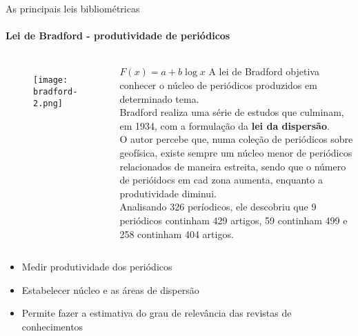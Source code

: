 \begin{frame}[t]{As principais leis bibliométricas}
    \framesubtitle{Lei de Bradford - produtividade de periódicos}
       
          

    \begin{columns}

        \begin{figure}
            \texttt{[image: bradford-2.png]}
        \end{figure}

        \centering
        $F(x) = a + b \log x$
        A lei de Bradford objetiva conhecer o núcleo de periódicos produzidos em determinado tema.\\
        \scriptsize{
            Bradford realiza uma série de estudos que culminam, em 1934, com a formulação da \textbf{lei da dispersão}.\\
            O autor percebe que, numa coleção de periódicos sobre geofísica, existe sempre um núcleo menor de periódicos relacionados de maneira estreita, sendo que o número de perióidocs em cad zona aumenta, enquanto a produtividade diminui.\\
            Analisando 326 períodicos, ele descobriu que 9 periódicos continham 429 artigos, 59 continham 499 e 258 continham 404 artigos.
        }
    \end{columns}

    \vspace*{0.2cm}
    \begin{itemize}
        \item Medir produtividade dos periódicos
        \item Estabelecer núcleo e as áreas de dispersão 
        \item Permite fazer a estimativa do grau de relevância das revistas de conhecimentos
    \end{itemize}
\end{frame}

